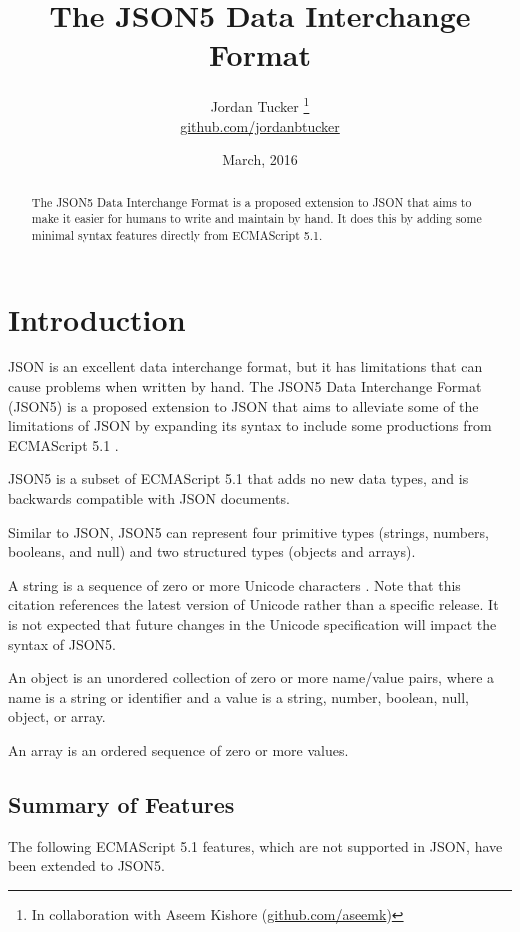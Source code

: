 \documentclass{article}
\title{The JSON5 Data Interchange Format}
\author{
	Jordan Tucker
	\thanks{
		In collaboration with Aseem Kishore
		(\href{https://github.com/aseemk}{github.com/aseemk})
	}\\
	\href{https://github.com/jordanbtucker}{github.com/jordanbtucker}
}
\date{March, 2016}
\begin{document}
\maketitle

\begin{abstract}
The JSON5 Data Interchange Format is a proposed extension to JSON that aims to
make it easier for humans to write and maintain by hand. It does this by adding
some minimal syntax features directly from ECMAScript 5.1.
\end{abstract}

\tableofcontents

\section{Introduction}

JSON \cite{json} \cite{rfc7159} is an excellent data interchange format, but it
has limitations that can cause problems when written by hand. The JSON5 Data
Interchange Format (JSON5) is a proposed extension to JSON that aims to
alleviate some of the limitations of JSON by expanding its syntax to include
some productions from ECMAScript 5.1 \cite{es5}.

JSON5 is a subset of ECMAScript 5.1 that adds no new data types, and is
backwards compatible with JSON documents.

Similar to JSON, JSON5 can represent four primitive types (strings, numbers,
booleans, and null) and two structured types (objects and arrays).

A string is a sequence of zero or more Unicode characters \cite{unicode}. Note
that this citation references the latest version of Unicode rather than a
specific release. It is not expected that future changes in the Unicode
specification will impact the syntax of JSON5.

An object is an unordered collection of zero or more name/value pairs, where a
name is a string or identifier and a value is a string, number, boolean, null,
object, or array.

An array is an ordered sequence of zero or more values.

\subsection{Summary of Features}

The following ECMAScript 5.1 features, which are not supported in JSON, have
been extended to JSON5.
\end{document}
